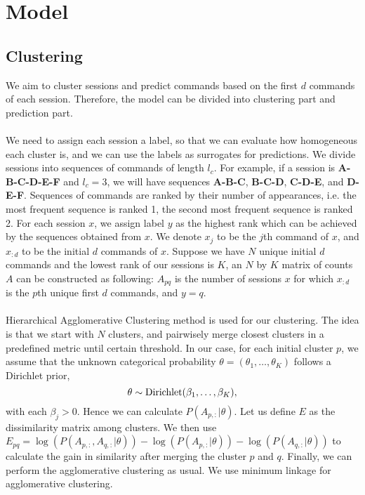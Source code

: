 \chapter{Model}

\section{Clustering}
We aim to cluster sessions and predict commands based on the first \(d\) commands of each session.
Therefore, the model can be divided into clustering part and prediction part.
\\\\
We need to assign each session a label, so that we can evaluate how homogeneous each cluster is,
and we can use the labels as surrogates for predictions.
We divide sessions into sequences of commands of length \(l_c\)\cite{sadique2021analysis}.
For example, if a session is \textbf{A-B-C-D-E-F} and \(l_c=3\), 
we will have sequences \textbf{A-B-C}, \textbf{B-C-D}, \textbf{C-D-E}, and \textbf{D-E-F}.
Sequences of commands are ranked by their number of appearances, 
i.e. the most frequent sequence is ranked 1, the second most frequent sequence is ranked 2.
For each session \(x\), we assign label \(y\) as the highest rank which can be achieved by the sequences obtained from \(x\).
We denote \(x_{j}\) to be the \(j\)th command of \(x\),
and \(x_{:d}\) to be the initial \(d\) commands of \(x\).
Suppose we have \(N\) unique initial \(d\) commands and the lowest rank of our sessions is \(K\),
an \(N\) by \(K\) matrix of counts \(A\) can be constructed as following: 
\(A_{pq}\) is the number of sessions \(x\) for which \(x_{:d}\) is the \(p\)th unique first \(d\) commands,
and \(y=q\).
\\\\
Hierarchical Agglomerative Clustering method is used for our clustering.
The idea is that we start with \(N\) clusters, and pairwisely
merge closest clusters in a predefined metric until certain threshold.
In our case, for each initial cluster \(p\), we assume that the unknown categorical probability
$\theta=(\theta_1,\ldots,\theta_K)$ follows a Dirichlet prior,
\begin{equation}
    \theta\sim \textnormal{Dirichlet}(\beta_1,\ldots,\beta_K),
\end{equation}
with each $\beta_j>0$. Hence we can calculate \(P(A_{p,:}|\theta)\).
Let us define \(E\) as the dissimilarity matrix among clusters.
We then use \(E_{pq}=\log(P(A_{p,:}, A_{q,:}|\theta)) - \log(P(A_{p,:}|\theta)) - \log(P(A_{q,:}|\theta))\)
to calculate the gain in similarity after merging the cluster \(p\) and \(q\). 
Finally, we can perform the agglomerative clustering as usual. 
We use minimum linkage for agglomerative clustering.

